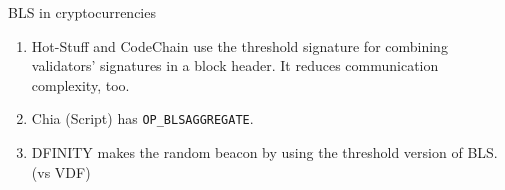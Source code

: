 \documentclass{beamer}
\begin{document}
\begin{frame}{BLS in cryptocurrencies}
\begin{enumerate}
\item Hot-Stuff and CodeChain use the threshold signature for combining validators' signatures in a block header. It reduces communication complexity, too.
\item Chia (Script) has \texttt{OP\_BLSAGGREGATE}.
\item DFINITY makes the random beacon by using the threshold version of BLS. (vs VDF)
\end{enumerate}
\end{frame}
\end{document}
